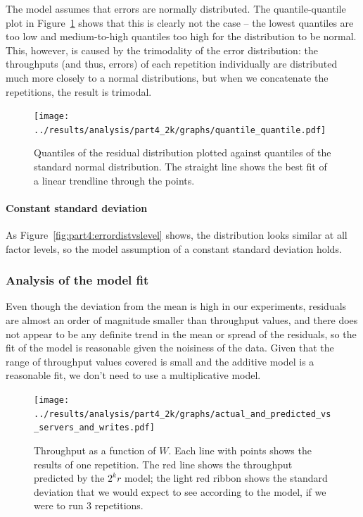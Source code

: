 \documentclass[11pt]{article}
\begin{document}
The model assumes that errors are normally distributed. The quantile-quantile plot in Figure~\ref{fig:part4:quantile_quantile} shows that this is clearly not the case -- the lowest quantiles are too low and medium-to-high quantiles too high for the distribution to be normal. This, however, is caused by the trimodality of the error distribution: the throughputs (and thus, errors) of each repetition individually are distributed much more closely to a normal distributions, but when we concatenate the repetitions, the result is trimodal.

\begin{figure}
\centering
\texttt{[image: ../results/analysis/part4\_2k/graphs/quantile\_quantile.pdf]}
\caption{Quantiles of the residual distribution plotted against quantiles of the standard normal distribution. The straight line shows the best fit of a linear trendline through the points.}
\label{fig:part4:quantile_quantile}
\end{figure}


\paragraph{Constant standard deviation} As Figure~\ref{fig:part4:errordistvslevel} shows, the distribution looks similar at all factor levels, so the model assumption of a constant standard deviation holds.


\subsubsection{Analysis of the model fit}

Even though the deviation from the mean is high in our experiments, residuals are almost an order of magnitude smaller than throughput values, and there does not appear to be any definite trend in the mean or spread of the residuals, so the fit of the model is reasonable given the noisiness of the data. Given that the range of throughput values covered is small and the additive model is a reasonable fit, we don't need to use a multiplicative model.

\begin{figure}[h]
\centering
\texttt{[image: ../results/analysis/part4\_2k/graphs/actual\_and\_predicted\_vs\_servers\_and\_writes.pdf]}
\caption{Throughput as a function of $W$. Each line with points shows the results of one repetition. The red line shows the throughput predicted by the $2^kr$ model; the light red ribbon shows the standard deviation that we would expect to see according to the model, if we were to run 3 repetitions.}
\label{fig:part4:actual_and_predicted_vs_servers_and_writes}
\end{figure}
\end{document}
